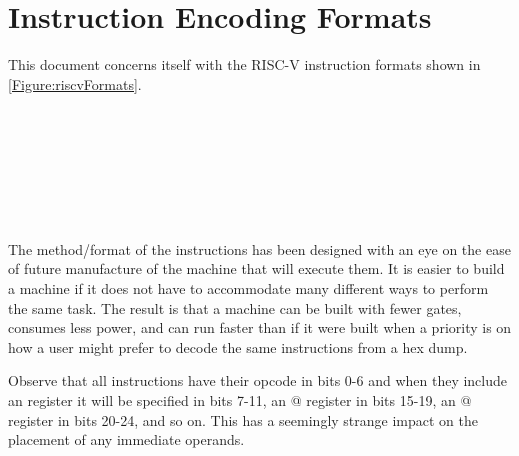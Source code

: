\section{Instruction Encoding Formats}
\label{section:EncodingFormats}





This document concerns itself with the RISC-V instruction formats shown 
in \autoref{Figure:riscvFormats}.


\begin{figure}[ht]
\\
\\
\\
\\
\\
\\
\label{Figure:riscvFormats}
\end{figure}

The method/format of the instructions has been designed with an eye on 
the ease of future manufacture of the machine that will execute them.  It is 
easier to build a machine if it does not have to accommodate many different 
ways to perform the same task.  The result is that a machine can be 
built with fewer gates, consumes less power, and can run faster than
if it were built when a priority is on how a user might prefer to decode
the same instructions from a hex dump.

Observe that all instructions have their opcode in bits 0-6 and when they
include an \verb@rd@ register it will be specified in bits 7-11, 
an @ register in bits 15-19, an @ register in bits 20-24,
and so on.  This has a seemingly strange impact on the placement of any 
immediate operands.

